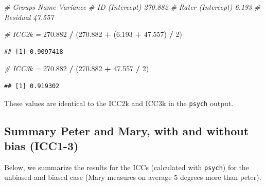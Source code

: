 \documentclass[
]{book}
\newenvironment{Shaded}{\begin{snugshade}}{\end{snugshade}}
\newcommand{\CommentTok}[1]{\textcolor[rgb]{0.56,0.35,0.01}{\textit{#1}}}
\newcommand{\DecValTok}[1]{\textcolor[rgb]{0.00,0.00,0.81}{#1}}
\newcommand{\FloatTok}[1]{\textcolor[rgb]{0.00,0.00,0.81}{#1}}
\newcommand{\NormalTok}[1]{#1}
\newcommand{\SpecialCharTok}[1]{\textcolor[rgb]{0.81,0.36,0.00}{\textbf{#1}}}
\begin{document}
\begin{Shaded}
\begin{Highlighting}[]
\CommentTok{\# Groups   Name        Variance}
\CommentTok{\# ID       (Intercept) 270.882 }
\CommentTok{\# Rater    (Intercept)   6.193 }
\CommentTok{\# Residual              47.557 }

\CommentTok{\# ICC2k =}
\FloatTok{270.882} \SpecialCharTok{/}\NormalTok{ (}\FloatTok{270.882} \SpecialCharTok{+}\NormalTok{ (}\FloatTok{6.193} \SpecialCharTok{+} \FloatTok{47.557}\NormalTok{) }\SpecialCharTok{/} \DecValTok{2}\NormalTok{)}
\end{Highlighting}
\end{Shaded}

\begin{verbatim}
## [1] 0.9097418
\end{verbatim}

\begin{Shaded}
\begin{Highlighting}[]
\CommentTok{\# ICC3k =}
\FloatTok{270.882} \SpecialCharTok{/}\NormalTok{ (}\FloatTok{270.882} \SpecialCharTok{+} \FloatTok{47.557} \SpecialCharTok{/} \DecValTok{2}\NormalTok{)}
\end{Highlighting}
\end{Shaded}

\begin{verbatim}
## [1] 0.919302
\end{verbatim}

These values are identical to the ICC2k and ICC3k in the \texttt{psych} output.

\subsection{Summary Peter and Mary, with and without bias (ICC1-3)}\label{summary-peter-and-mary-with-and-without-bias-icc1-3}

Below, we summarize the results for the ICCs (calculated with \texttt{psych})
for the unbiased and biased case (Mary measures on average 5 degrees more than peter).
\end{document}
